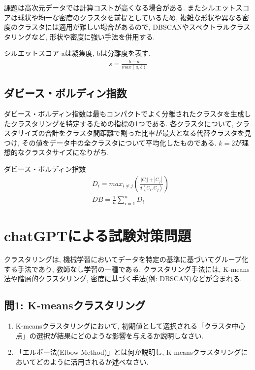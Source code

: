 \documentclass[dvipdfmx, 10pt]{jsarticle}
\begin{document}
課題は高次元データでは計算コストが高くなる場合がある. 
またシルエットスコアは球状や均一な密度のクラスタを前提としているため, 
複雑な形状や異なる密度のクラスタには適用が難しい場合があるので, 
DBSCANやスペクトラルクラスタリングなど, 形状や密度に強い手法を併用する.

\begin{oframed}
    \noindent
    シルエットスコア aは凝集度, bは分離度を表す. 
    \begin{align*}
        s = \frac{b-a}{max(a, b)}  
    \end{align*}
\end{oframed}

\subsection*{ダビース・ボルディン指数}
ダビース・ボルディン指数は最もコンパクトでよく分離されたクラスタを生成したクラスタリングを特定するための指標の1つである. 
各クラスタについて, クラスタサイズの合計をクラスタ間距離で割った比率が最大となる代替クラスタを見つけ, 
その値をデータ中の全クラスタについて平均化したものである. \(k=2\)が理想的なクラスタサイズになりがち. 

\begin{oframed}
    \noindent
    ダビース・ボルディン指数
    \begin{align*}
        & D_i = max_{i \neq j}(\frac{|C_i|+|C_j|}{d(C_i, C_j)}) \\
        & DB = \frac{1}{n} \sum_{i=1}^{n} D_i
    \end{align*}
\end{oframed}

\section*{chatGPTによる試験対策問題}
クラスタリングは, 機械学習においてデータを特定の基準に基づいてグループ化する手法であり, 教師なし学習の一種である. クラスタリング手法には, K-means法や階層的クラスタリング, 密度に基づく手法(例: DBSCAN)などが含まれる. 

\subsection*{問1: K-meansクラスタリング}
\begin{enumerate}
    \item K-meansクラスタリングにおいて, 初期値として選択される「クラスタ中心点」の選択が結果にどのような影響を与えるか説明しなさい. 
    \item 「エルボー法(Elbow Method)」とは何か説明し, K-meansクラスタリングにおいてどのように活用されるか述べなさい. 
\end{enumerate}
\end{document}
